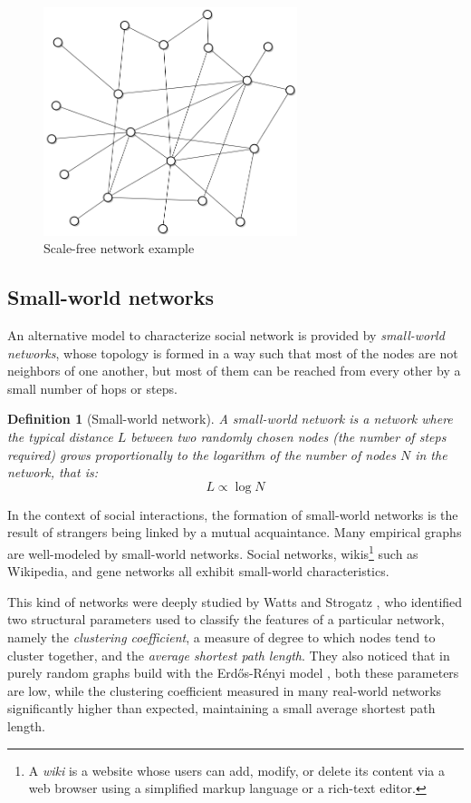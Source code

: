 \documentclass[11pt, twoside, titlepage, a4paper, openright]{report}
\newtheorem{Def}{Definition}
\begin{document}
\begin{figure}[!h]
	\centering
	\includegraphics[width=0.66\textwidth]{img/scalefree.png}
	\caption{\label{fig:scalefree}Scale-free network example}
\end{figure}

\subsection{Small-world networks}

An alternative model to characterize social network is provided by \textit{small-world networks}, whose topology is formed in a way such that most of the nodes are not neighbors of one another, but most of them can be reached from every other by a small number of hops or steps.

\begin{Def}[Small-world network]
A \textit{small-world network} is a network where the typical distance $L$ between two randomly chosen nodes (the number of steps required) grows proportionally to the logarithm of the number of nodes $N$ in the network, that is:
$$L \propto \log N$$
\end{Def}

\noindent In the context of social interactions, the formation of small-world networks is the result of strangers being linked by a mutual acquaintance. Many empirical graphs are well-modeled by small-world networks. Social networks, wikis\footnote{A \textit{wiki} is a website whose users can add, modify, or delete its content via a web browser using a simplified markup language or a rich-text editor.} such as Wikipedia, and gene networks all exhibit small-world characteristics.

This kind of networks were deeply studied by Watts and Strogatz \cite{citeulike:99}, who identified two structural parameters used to classify the features of a particular network, namely the \textit{clustering coefficient}, a measure of degree to which nodes tend to cluster together, and the \textit{average shortest path length}. They also noticed that in purely random graphs build with the Erdős-Rényi model \cite{Erdos1959}, both these parameters are low, while the clustering coefficient measured in many real-world networks significantly higher than expected, maintaining a small average shortest path length.
\end{document}
